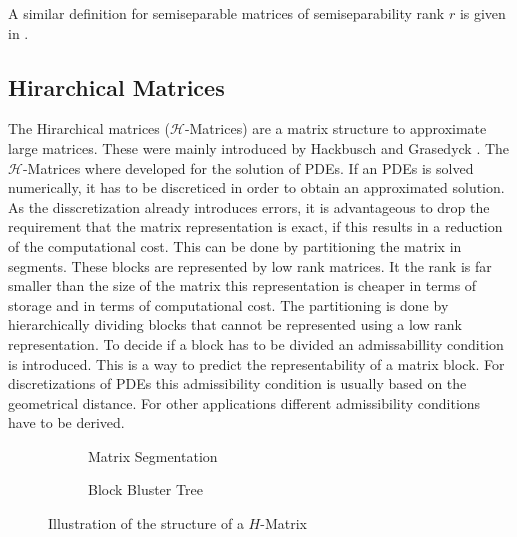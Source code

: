 \documentclass[doctype=mastersthesis,BCOR=15mm,biblatex]{ldvbook}%
\begin{document}
A similar definition for semiseparable matrices of semiseparability rank $r$ is given in \cite{vandebril_bibliography_2005}.

\subsection{Hirarchical Matrices}\label{subsec:H-mat}
The Hirarchical matrices ($\mathcal{H}$-Matrices) are a matrix structure to approximate large matrices. These were mainly introduced by Hackbusch \cite{hackbusch_hierarchische_2009} and Grasedyck \cite{grasedyck_theorie_2001}.
The $\mathcal{H}$-Matrices where developed for the solution of PDEs.
If an PDEs is solved numerically, it has to be discreticed in order to obtain an approximated solution.
As the disscretization already introduces errors, it is advantageous to drop the requirement that the matrix representation is exact, if this results in a reduction of the computational cost.
This can be done by partitioning the matrix in segments. These blocks are represented by low rank matrices. It the rank is far smaller than the size of the matrix this representation is cheaper in terms of storage and in terms of computational cost.
The partitioning is done by hierarchically dividing blocks that cannot be represented using a low rank representation.
To decide if a block has to be divided an admissabillity condition is introduced.
This is a way to predict the representability of a matrix block.
For discretizations of PDEs this admissibility condition is usually based on the geometrical distance.
For other applications different admissibility conditions have to be derived.

\begin{figure}
	\centering
	\begin{subfigure}[b]{0.45\textwidth}
		\centering
		
		\caption{Matrix Segmentation}
		\label{fig:strukturh-matrix_a}
	\end{subfigure}
	\begin{subfigure}[b]{0.45\textwidth}
	\centering
	\resizebox{0.7\textwidth}{!}{
	
	}
	\caption{Block Bluster Tree}
	\label{fig:strukturh-matrix_b}
	\end{subfigure}
	\caption{Illustration of the structure of a $H$-Matrix}
	\label{fig:strukturh-matrix}
\end{figure}
\end{document}
